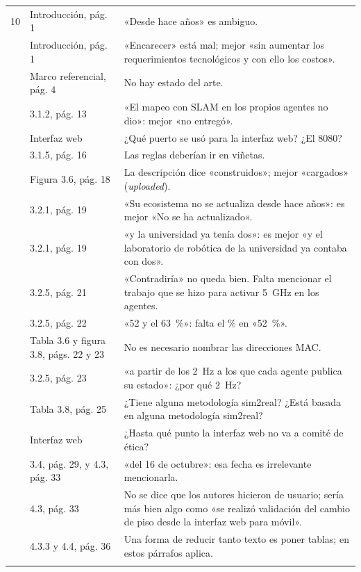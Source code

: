 \documentclass[11pt]{article}
\begin{document}
{\begin{longtable}{@{}L{0.04\textwidth}L{0.24\textwidth}L{0.66\textwidth}@{}}
10 & Introducción, pág. 1 & «Desde hace años» es ambiguo. \\  & Introducción, pág. 1 & «Encarecer» está mal; mejor «sin aumentar los requerimientos tecnológicos y con ello los costos». \\  & Marco referencial, pág. 4 & No hay estado del arte. \\  & 3.1.2, pág. 13 & «El mapeo con SLAM en los propios agentes no dio»: mejor «no entregó». \\  & Interfaz web & ¿Qué puerto se usó para la interfaz web? ¿El 8080? \\  & 3.1.5, pág. 16 & Las reglas deberían ir en viñetas. \\  & Figura 3.6, pág. 18 & La descripción dice «construidos»; mejor «cargados» (\textit{uploaded}). \\  & 3.2.1, pág. 19 & «Su ecosistema no se actualiza desde hace años»: es mejor «No se ha actualizado». \\  & 3.2.1, pág. 19 & «y la universidad ya tenía dos»: es mejor «y el laboratorio de robótica de la universidad ya contaba con dos». \\  & 3.2.5, pág. 21 & «Contradiría» no queda bien. Falta mencionar el trabajo que se hizo para activar 5~GHz en los agentes. \\  & 3.2.5, pág. 22 & «52 y el 63~\%»: falta el \% en «52~\%». \\  & Tabla 3.6 y figura 3.8, págs. 22 y 23 & No es necesario nombrar las direcciones MAC. \\  & 3.2.5, pág. 23 & «a partir de los 2~Hz a los que cada agente publica su estado»: ¿por qué 2~Hz? \\  & Tabla 3.8, pág. 25 & ¿Tiene alguna metodología sim2real? ¿Está basada en alguna metodología sim2real? \\  & Interfaz web & ¿Hasta qué punto la interfaz web no va a comité de ética? \\  & 3.4, pág. 29, y 4.3, pág. 33 & «del 16 de octubre»: esa fecha es irrelevante mencionarla. \\  & 4.3, pág. 33 & No se dice que los autores hicieron de usuario; sería más bien algo como «se realizó validación del cambio de piso desde la interfaz web para móvil». \\  & 4.3.3 y 4.4, pág. 36 & Una forma de reducir tanto texto es poner tablas; en estos párrafos aplica. \\ \addlinespace

\end{longtable}}
\end{document}
